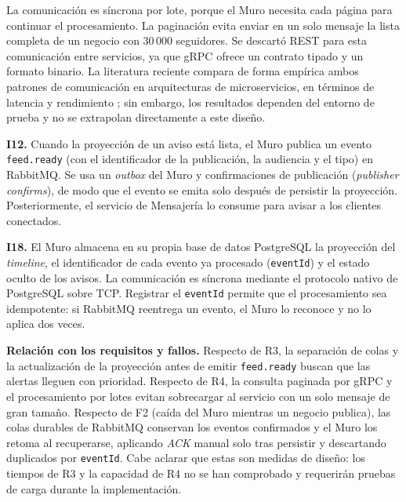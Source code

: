 \documentclass[12pt,a4paper]{article}
\begin{document}
La comunicación es síncrona por lote, porque el Muro necesita cada página para
continuar el procesamiento. La paginación evita enviar en un solo mensaje la
lista completa de un negocio con 30\,000 seguidores. Se
descartó REST para esta comunicación entre servicios, ya que gRPC ofrece un
contrato tipado y un formato binario. La literatura reciente compara de forma
empírica ambos patrones de comunicación en arquitecturas de microservicios,
en términos de latencia y rendimiento \cite{vairam2026grpc}; sin embargo, los
resultados dependen del entorno de prueba y no se extrapolan directamente a
este diseño.

\textbf{I12.} Cuando la proyección de un aviso está lista, el Muro publica un
evento \texttt{feed.ready} (con el identificador de la publicación, la
audiencia y el tipo) en RabbitMQ. Se usa un \textit{outbox} del Muro y
confirmaciones de publicación (\textit{publisher confirms}), de modo que el
evento se emita solo después de persistir la proyección. Posteriormente, el
servicio de Mensajería lo consume para avisar a los clientes conectados.

\textbf{I18.} El Muro almacena en su propia base de datos PostgreSQL la
proyección del \textit{timeline}, el identificador de cada evento ya procesado
(\texttt{eventId}) y el estado oculto de los avisos. La comunicación es
síncrona mediante el protocolo nativo de PostgreSQL sobre TCP. Registrar el
\texttt{eventId} permite que el procesamiento sea idempotente: si RabbitMQ
reentrega un evento, el Muro lo reconoce y no lo aplica dos veces.

\textbf{Relación con los requisitos y fallos.} Respecto de R3, la separación de
colas y la actualización de la proyección antes de emitir \texttt{feed.ready}
buscan que las alertas lleguen con prioridad. Respecto de R4, la consulta
paginada por gRPC y el procesamiento por lotes evitan sobrecargar al servicio
con un solo mensaje de gran tamaño. 
Respecto de F2 (caída del Muro mientras un negocio publica), las colas durables de RabbitMQ conservan los eventos confirmados y el Muro los retoma al recuperarse, aplicando \textit{ACK} manual solo tras persistir y descartando duplicados por \texttt{eventId}. Cabe aclarar que estas son medidas de diseño: los tiempos de R3 y la capacidad de R4 no se han comprobado y requerirán pruebas de carga durante la implementación.

\newpage
\end{document}
